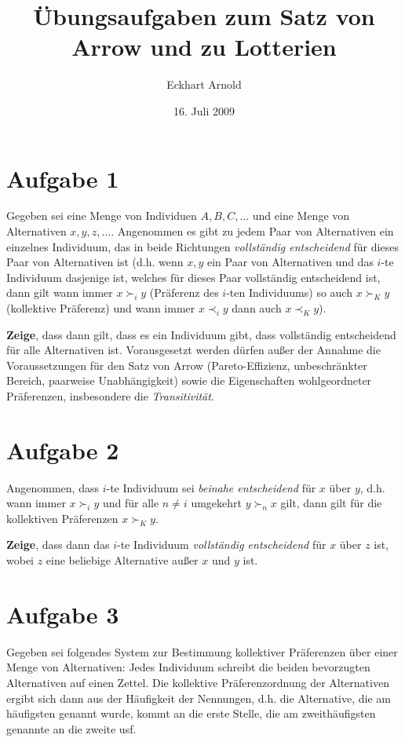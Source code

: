 \documentclass[12pt, a4paper, german]{article}
\begin{document}
\title{Übungsaufgaben zum Satz von Arrow und zu Lotterien}

\author{Eckhart Arnold}
\date{16. Juli 2009}

\maketitle

\section{Aufgabe 1}

Gegeben sei eine Menge von Individuen $A, B, C, \ldots$ und eine Menge von
Alternativen $x, y, z, \ldots$. Angenommen es gibt zu jedem Paar von Alternativen
ein einzelnes Individuum, das in beide Richtungen {\em vollständig
entscheidend} für dieses Paar von Alternativen ist (d.h. wenn $x,y$ ein Paar von
Alternativen und das $i$-te Individuum dasjenige ist, welches für dieses Paar
vollständig entscheidend ist, dann gilt wann immer $x \succ_i y$ (Präferenz des
$i$-ten Individuums) so auch $x \succ_K y$ (kollektive Präferenz) und wann immer
$x \prec_i y$ dann auch $x \prec_K y$).

{\bf Zeige}, dass dann gilt, dass es ein Individuum gibt, dass vollständig
entscheidend für alle Alternativen ist. Vorausgesetzt werden dürfen außer der
Annahme die Voraussetzungen für den Satz von Arrow (Pareto-Effizienz,
unbeschränkter Bereich, paarweise Unabhängigkeit) sowie die Eigenschaften
wohlgeordneter Präferenzen, insbesondere die {\em Transitivität}.

\section{Aufgabe 2}

Angenommen, dass $i$-te Individuum sei {\em beinahe entscheidend} für $x$
über $y$, d.h. wann immer $x \succ_i y$ und für alle $n \neq i$ umgekehrt $y
\succ_n x$ gilt, dann gilt für die kollektiven Präferenzen $x \succ_K y$.

{\bf Zeige}, dass dann das $i$-te Individuum {\em vollständig entscheidend} für 
$x$ über $z$ ist, wobei $z$ eine beliebige Alternative außer $x$ und $y$ ist.

\section{Aufgabe 3}

Gegeben sei folgendes System zur Bestimmung kollektiver Präferenzen über einer
Menge von Alternativen: Jedes Individuum schreibt die beiden bevorzugten
Alternativen auf einen Zettel. Die kollektive Präferenzordnung der Alternativen
ergibt sich dann aus der Häufigkeit der Nennungen, d.h. die Alternative, die am
häufigsten genannt wurde, kommt an die erste Stelle, die am zweithäufigsten
genannte an die zweite usf. 
\end{document}
